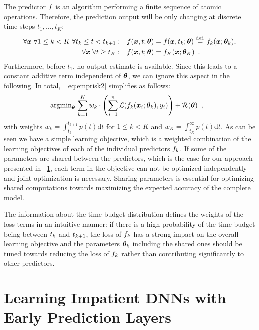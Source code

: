 \documentclass{bmvc2k}
\begin{document}
    The predictor $f$ is an algorithm performing a finite sequence of atomic operations. Therefore,
    the prediction output will be only changing at discrete time steps $t_1, \ldots, t_K$:
    \begin{align}
        \forall \bm{x} \;\forall 1 \leq k < K\; \forall t_k \leq t < t_{k+1}:\quad& f(\bm{x}, t; \bm{\theta}) = f(\bm{x}, t_k; \bm{\theta}) \stackrel{\text{def.}}{=} f_k(\bm{x}; \bm{\theta}_k),\\
        \forall \bm{x} \; \forall t \geq t_K:\quad& f(\bm{x}, t; \bm{\theta}) = f_K(\bm{x}; \bm{\theta}_K)\enspace.
    \end{align}
    Furthermore, before $t_1$, no output estimate is available. Since this leads to a constant additive term independent
    of $\bm{\theta}$, we can ignore this aspect in the following.
    In total, \equationname~\eqref{eq:emprisk2} simplifies as follows:
    \begin{align}
        \label{eq:emprisk3}
        &\operatorname{\text{argmin}}_{\bm{\theta}}\, \sum\limits_{k=1}^{K} w_k \cdot \left( \sum\limits_{i=1}^{n}
    \mathcal{L}( f_k(\bm{x}_i; \bm{\theta}_k), y_i ) \right) + \mathcal{R}(\bm{\theta}) \enspace,
    \end{align}
    with weights $w_k = \int_{t_k}^{t_{k+1}} p(t) \mathrm{d}t$ for $1 \leq k < K$ and $w_K = \int_{t_K}^{\infty} p(t) \mathrm{d}t$.
    As can be seen we have a simple learning objective, which is a weighted combination of the learning objectives of each of the
    individual predictors $f_k$. If some of the parameters are shared between the predictors, which is the case for our approach presented in \sectionname~\ref{sec:impatientcnns},
    each term in the objective can not be optimized independently and joint optimization is necessary.
    Sharing parameters is essential for optimizing shared computations towards maximizing the expected accuracy of the complete model.

    The information about the time-budget distribution defines the weights of the loss terms in an intuitive manner:
    if there is a high probability of the time budget being between
    $t_{k}$ and $t_{k+1}$, the loss of $f_k$ has a strong impact on the overall learning objective and
    the parameters $\bm{\theta}_k$ including the shared ones should be tuned towards reducing the loss of $f_k$ rather
    than contributing significantly to other predictors.

\section{Learning Impatient DNNs with Early Prediction Layers}
\label{sec:impatientcnns}
\end{document}
